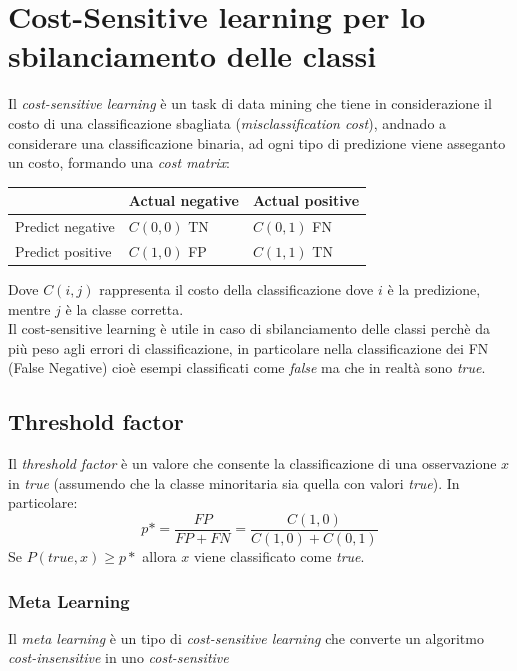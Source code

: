 \documentclass[italian,12pt,a4paper]{article}
\begin{document}
	\section{Cost-Sensitive learning per lo sbilanciamento delle classi}
	Il \textit{cost-sensitive learning} è un task di data mining che tiene in considerazione il costo di una classificazione sbagliata (\textit{misclassification cost}), andnado a considerare una classificazione binaria, ad ogni tipo di predizione viene asseganto un costo, formando una \textit{cost matrix}: \\
	\begin{center}
		\begin{tabularx}{0.8\textwidth} { 
				| >{\centering\arraybackslash}X 
				| >{\centering\arraybackslash}X 
				| >{\centering\arraybackslash}X | }
			\hline
			 & Actual negative & Actual positive \\
			\hline
			Predict negative & $C(0, 0)$ TN & $C(0, 1)$ FN \\
			\hline
			Predict positive  & $C(1, 0)$ FP & $C(1, 1)$ TN \\
			\hline
		\end{tabularx}
	\end{center}

	Dove $C(i, j)$ rappresenta il costo della classificazione dove $i$ è la predizione, mentre $j$ è la classe corretta. \\
	Il cost-sensitive learning è utile in caso di sbilanciamento delle classi perchè da più peso agli errori di classificazione, in particolare nella classificazione dei FN (False Negative) cioè esempi classificati come \textit{false} ma che in realtà sono \textit{true}.
	
	\subsection{Threshold factor}
	Il \textit{threshold factor} è un valore che consente la classificazione di una osservazione $x$ in \textit{true} (assumendo che la classe minoritaria sia quella con valori \textit{true}).
	\linebreak
	In particolare: $$p* = \frac{FP}{FP + FN} = \frac{C(1, 0)}{C(1, 0) + C(0, 1)}$$
	Se $P(true, x) \ge p*$ allora $x$ viene classificato come \textit{true}.
	
	\subsubsection{Meta Learning}
	Il \textit{meta learning} è un tipo di \textit{cost-sensitive learning} che converte un algoritmo \textit{cost-insensitive} in uno \textit{cost-sensitive}
	
\end{document}
